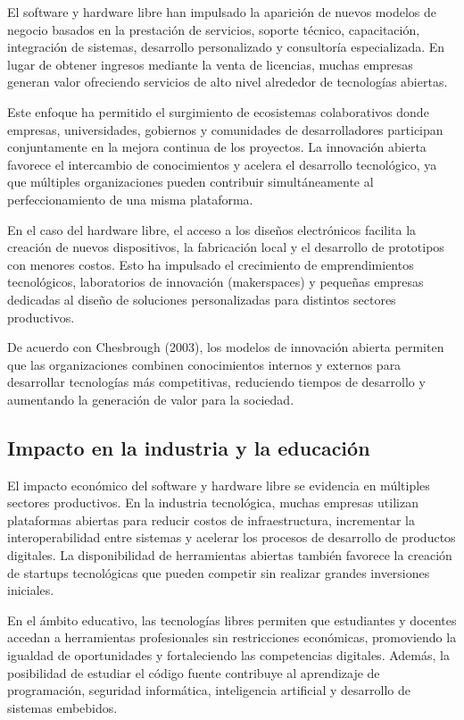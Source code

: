 \documentclass[12pt]{article}
\begin{document}
	El software y hardware libre han impulsado la aparición de nuevos modelos de negocio basados en la prestación de servicios, soporte técnico, capacitación, integración de sistemas, desarrollo personalizado y consultoría especializada. En lugar de obtener ingresos mediante la venta de licencias, muchas empresas generan valor ofreciendo servicios de alto nivel alrededor de tecnologías abiertas.
	
	Este enfoque ha permitido el surgimiento de ecosistemas colaborativos donde empresas, universidades, gobiernos y comunidades de desarrolladores participan conjuntamente en la mejora continua de los proyectos. La innovación abierta favorece el intercambio de conocimientos y acelera el desarrollo tecnológico, ya que múltiples organizaciones pueden contribuir simultáneamente al perfeccionamiento de una misma plataforma.
	
	En el caso del hardware libre, el acceso a los diseños electrónicos facilita la creación de nuevos dispositivos, la fabricación local y el desarrollo de prototipos con menores costos. Esto ha impulsado el crecimiento de emprendimientos tecnológicos, laboratorios de innovación (makerspaces) y pequeñas empresas dedicadas al diseño de soluciones personalizadas para distintos sectores productivos.
	
	De acuerdo con Chesbrough (2003), los modelos de innovación abierta permiten que las organizaciones combinen conocimientos internos y externos para desarrollar tecnologías más competitivas, reduciendo tiempos de desarrollo y aumentando la generación de valor para la sociedad.
	\subsection{Impacto en la industria y la educación}
	
	El impacto económico del software y hardware libre se evidencia en múltiples sectores productivos. En la industria tecnológica, muchas empresas utilizan plataformas abiertas para reducir costos de infraestructura, incrementar la interoperabilidad entre sistemas y acelerar los procesos de desarrollo de productos digitales. La disponibilidad de herramientas abiertas también favorece la creación de startups tecnológicas que pueden competir sin realizar grandes inversiones iniciales.
	
	En el ámbito educativo, las tecnologías libres permiten que estudiantes y docentes accedan a herramientas profesionales sin restricciones económicas, promoviendo la igualdad de oportunidades y fortaleciendo las competencias digitales. Además, la posibilidad de estudiar el código fuente contribuye al aprendizaje de programación, seguridad informática, inteligencia artificial y desarrollo de sistemas embebidos.
	
\end{document}
